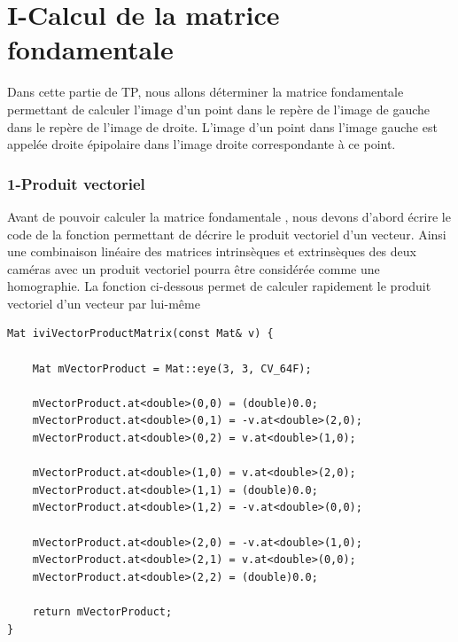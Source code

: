 \documentclass[a4paper,12pt]{report}
\begin{document}
\section*{I-Calcul de la matrice fondamentale}
Dans cette partie de TP, nous allons déterminer la matrice fondamentale permettant de calculer l'image d'un point dans le repère de l'image de gauche dans le repère de l'image de droite. L'image d'un point dans  l'image gauche est appelée droite épipolaire dans l'image droite correspondante à ce point.
\subsubsection*{1-Produit vectoriel}

\noindent Avant de pouvoir calculer la matrice fondamentale , nous devons d'abord écrire le code de la fonction permettant de décrire le produit vectoriel d'un vecteur. Ainsi une combinaison linéaire des matrices intrinsèques et extrinsèques des deux caméras avec un produit vectoriel pourra être considérée comme une homographie.
La fonction ci-dessous permet de calculer rapidement le produit vectoriel d'un vecteur par lui-même 
\begin{lstlisting}[style=C++]
Mat iviVectorProductMatrix(const Mat& v) {

    Mat mVectorProduct = Mat::eye(3, 3, CV_64F);

    mVectorProduct.at<double>(0,0) = (double)0.0;
    mVectorProduct.at<double>(0,1) = -v.at<double>(2,0);
    mVectorProduct.at<double>(0,2) = v.at<double>(1,0);

    mVectorProduct.at<double>(1,0) = v.at<double>(2,0);
    mVectorProduct.at<double>(1,1) = (double)0.0;
    mVectorProduct.at<double>(1,2) = -v.at<double>(0,0);

    mVectorProduct.at<double>(2,0) = -v.at<double>(1,0);
    mVectorProduct.at<double>(2,1) = v.at<double>(0,0);
    mVectorProduct.at<double>(2,2) = (double)0.0;

    return mVectorProduct;
}
\end{lstlisting}
\end{document}
